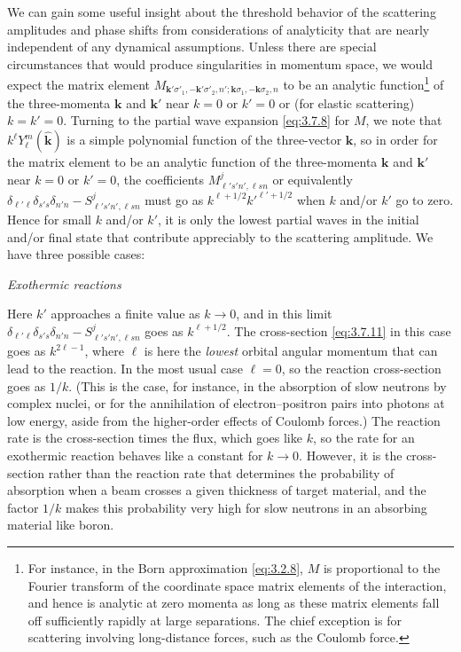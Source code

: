 We can gain some useful insight about the threshold behavior of the scattering
amplitudes and phase shifts from considerations of analyticity that are nearly
independent of any dynamical assumptions. Unless there are special
circumstances that would produce singularities in momentum space, we would
expect the matrix element
$M_{\mathbf k'\sigma'_1,-\mathbf k'\sigma'_2,n';
\mathbf k\sigma_1,-\mathbf k\sigma_2,n}$ to be an analytic
function\footnote{For instance, in the Born approximation \eqref{eq:3.2.8}, $M$ is
proportional to the Fourier transform of the coordinate space matrix elements
of the interaction, and hence is analytic at zero momenta as long as these
matrix elements fall off sufficiently rapidly at large separations. The chief
exception is for scattering involving long-distance forces, such as the
Coulomb force.} of the three-momenta $\mathbf k$ and $\mathbf k'$ near $k=0$
or $k'=0$ or (for elastic scattering) $k=k'=0$. Turning to the partial wave
expansion \eqref{eq:3.7.8} for $M$, we note that $k^\ell Y_\ell^m(\widehat{\mathbf k})$
is a simple polynomial function of the three-vector $\mathbf k$, so in order
for the matrix element to be an analytic function of the three-momenta
$\mathbf k$ and $\mathbf k'$ near $k=0$ or $k'=0$, the coefficients
$M^j_{\ell's'n',\ell sn}$ or equivalently
$\delta_{\ell'\ell}\delta_{s's}\delta_{n'n}-S^j_{\ell's'n',\ell sn}$ must
go as $k^{\ell+1/2}k'^{\ell'+1/2}$ when $k$ and/or $k'$ go to zero. Hence for
small $k$ and/or $k'$, it is only the lowest partial waves in the initial
and/or final state that contribute appreciably to the scattering amplitude.
We have three possible cases:

\begin{center}\emph{Exothermic reactions}\end{center}

Here $k'$ approaches a finite value as $k\to0$, and in this limit
$\delta_{\ell'\ell}\delta_{s's}\delta_{n'n}
-S^j_{\ell's'n',\ell sn}$ goes as $k^{\ell+1/2}$. The cross-section \eqref{eq:3.7.11}
in this case goes as $k^{2\ell-1}$, where $\ell$ is here the \emph{lowest}
orbital angular momentum that can lead to the reaction. In the most usual case
$\ell=0$, so the reaction cross-section goes as $1/k$. (This is the case, for
instance, in the absorption of slow neutrons by complex nuclei, or for the
annihilation of electron--positron pairs into photons at low energy, aside
from the higher-order effects of Coulomb forces.) The reaction rate is the
cross-section times the flux, which goes like $k$, so the rate for an
exothermic reaction behaves like a constant for $k\to0$. However, it is the
cross-section rather than the reaction rate that determines the probability
of absorption when a beam crosses a given thickness of target material, and
the factor $1/k$ makes this probability very high for slow neutrons in an
absorbing material like boron.

